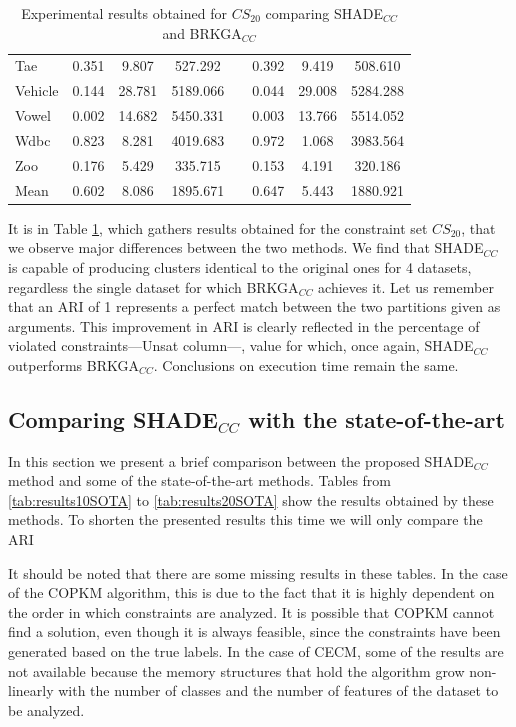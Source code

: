 \documentclass[review]{elsarticle}
\begin{document}
\begin{table}[!h]
{\begin{tabular}{l ccc c ccc}
			Tae & 0.351 & 9.807 & 527.292 && 0.392 & 9.419 & 508.610 \\
			Vehicle & 0.144 & 28.781 & 5189.066 && 0.044 & 29.008 & 5284.288 \\
			Vowel & 0.002 & 14.682 & 5450.331 && 0.003 & 13.766 & 5514.052 \\
			Wdbc & 0.823 & 8.281 & 4019.683 && 0.972 & 1.068 & 3983.564 \\
			Zoo & 0.176 & 5.429 & 335.715 && 0.153 & 4.191 & 320.186 \\
			\hline
			Mean & 0.602 & 8.086 & 1895.671 && 0.647 & 5.443 & 1880.921 \\
			\hline

		\end{tabular}}

	\caption{Experimental results obtained for $CS_{20}$ comparing SHADE$_{CC}$ and BRKGA$_{CC}$}
	\label{tab:results20}
\end{table}

It is in Table \ref{tab:results20}, which gathers results obtained for the constraint set $CS_{20}$, that we observe major differences between the two methods. We find that SHADE$_{CC}$ is capable of producing clusters identical to the original ones for 4 datasets, regardless the single dataset for which BRKGA$_{CC}$ achieves it. Let us remember that an ARI of 1 represents a perfect match between the two partitions given as arguments. This improvement in ARI is clearly reflected in the percentage of violated constraints---Unsat column---, value for which, once again, SHADE$_{CC}$ outperforms BRKGA$_{CC}$. Conclusions on execution time remain the same.

\clearpage

\subsection{Comparing SHADE$_{CC}$ with the state-of-the-art} \label{sec:SHADEvsSOTA}

In this section we present a brief comparison between the proposed SHADE$_{CC}$ method and some of the state-of-the-art methods. Tables from \ref{tab:results10SOTA} to \ref{tab:results20SOTA} show the results obtained by these methods. To shorten the presented results this time we will only compare the ARI

It should be noted that there are some missing results in these tables. In the case of the COPKM algorithm, this is due to the fact that it is highly dependent on the order in which constraints are analyzed. It is possible that COPKM cannot find a solution, even though it is always feasible, since the constraints have been generated based on the true labels. In the case of CECM, some of the results are not available because the memory structures that hold the algorithm grow non-linearly with the number of classes and the number of features of the dataset to be analyzed.
	
\end{document}
